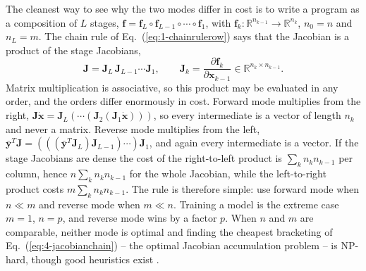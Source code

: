 The cleanest way to see why the two modes differ in cost is to write a program
as a composition of $L$ stages,
$\bm{f}=\bm{f}_L\circ\bm{f}_{L-1}\circ\cdots\circ\bm{f}_1$, with
$\bm{f}_k:\mathbb{R}^{n_{k-1}}\to\mathbb{R}^{n_k}$, $n_0=n$ and $n_L=m$.  The
chain rule of Eq.~(\ref{eq:1-chainrulerow}) says that the Jacobian is a
product of the stage Jacobians,
\begin{equation}
  \bm{J} = \bm{J}_L\,\bm{J}_{L-1}\cdots\bm{J}_1 ,
  \qquad
  \bm{J}_k = \frac{\partial\bm{f}_k}{\partial\bm{x}_{k-1}}\in\mathbb{R}^{n_k\times n_{k-1}} .
  \label{eq:4-jacobianchain}
\end{equation}
Matrix multiplication is associative, so this product may be evaluated in any
order, and the orders differ enormously in cost.  Forward mode multiplies from
the right, $\bm{J}\dot{\bm{x}}=\bm{J}_L(\cdots(\bm{J}_2(\bm{J}_1\dot{\bm{x}})))$,
so every intermediate is a vector of length $n_k$ and never a matrix.  Reverse
mode multiplies from the left, $\bar{\bm{y}}^{T}\bm{J}
=(((\bar{\bm{y}}^{T}\bm{J}_L)\bm{J}_{L-1})\cdots)\bm{J}_1$, and again every
intermediate is a vector.  If the stage Jacobians are dense the cost of the
right-to-left product is $\sum_k n_kn_{k-1}$ per column, hence
$n\sum_kn_kn_{k-1}$ for the whole Jacobian, while the left-to-right product
costs $m\sum_kn_kn_{k-1}$.  The rule is therefore simple: use forward mode
when $n\ll m$ and reverse mode when $m\ll n$.  Training a model is the
extreme case $m=1$, $n=p$, and reverse mode wins by a factor $p$.  When $n$
and $m$ are comparable, neither mode is optimal and finding the cheapest
bracketing of Eq.~(\ref{eq:4-jacobianchain}) -- the optimal Jacobian
accumulation problem -- is NP-hard, though good heuristics exist
\cite{griewank2008}.


